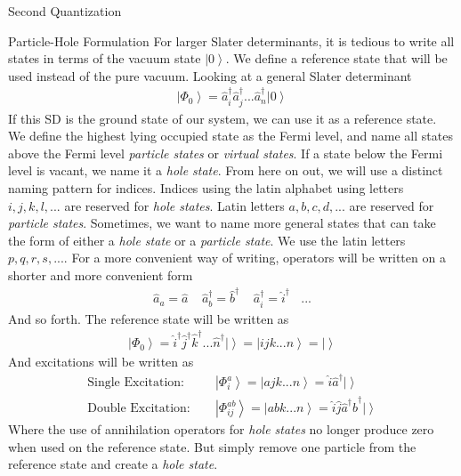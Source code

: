 \documentclass[twoside,english]{uiofysmaster}
\begin{document}
\begin{chapter}{Second Quantization}
	\begin{section}{Particle-Hole Formulation}
		For larger Slater determinants, it is tedious to write all states in terms of the vacuum state $\left| 0 \right>$. We define a reference state that will be used instead of the pure vacuum. Looking at a general Slater determinant
		\begin{align}
			\left| \Phi_0 \right> = \hat a_i^\dagger \hat a_j^\dagger ... \hat a_n^\dagger \left| 0 \right>
		\end{align}
		If this SD is the ground state of our system, we can use it as a reference state. We define the highest lying occupied state as the Fermi level, and name all states above the Fermi level \textit{particle states} or \textit{virtual states}. If a state below the Fermi level is vacant, we name it a \textit{hole state}. From here on out, we will use a distinct naming pattern for indices. Indices using the latin alphabet using letters $i, j, k, l, ...$ are reserved for \textit{hole states}. Latin letters $a, b, c, d, ...$ are reserved for \textit{particle states}. Sometimes, we want to name more general states that can take the form of either a \textit{hole state} or a \textit{particle state}. We use the latin letters $p, q, r, s, ...$. For a more convenient way of writing, operators will be written on a shorter and more convenient form
		\begin{align}
			\hat a_a = \hat a \:\:\:\:\: \hat a_b^\dagger = \hat b^\dagger \:\:\:\:\: \hat a_i^\dagger = \hat i^\dagger \:\:\:\: ...
		\end{align}
		And so forth. The reference state will be written as 
		\begin{align}
			\left| \Phi_0 \right> = \hat i^\dagger \hat j^\dagger \hat k^\dagger ... \hat n^\dagger \left| \right> = \left| ijk ... n \right> = \left| \right>
		\end{align}
		And excitations will be written as
		\begin{align}
			\text{Single Excitation: }\:\:\:\:& \left| \Phi_i^a \right> = \left| ajk ... n \right> = \hat i \hat a^\dagger \left| \right> \\
			\text{Double Excitation: }\:\:\:\:& \left| \Phi_{ij}^{ab} \right> = \left| abk ... n \right> = \hat i \hat j \hat a^\dagger \hat b^\dagger \left| \right> 
		\end{align}
		Where the use of annihilation operators for \textit{hole states} no longer produce zero when used on the reference state. But simply remove one particle from the reference state and create a \textit{hole state}. 

\end{section}
\end{chapter}
\end{document}
